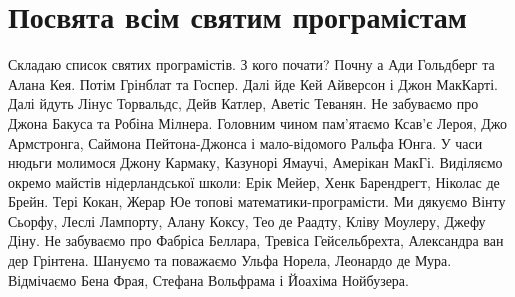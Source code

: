 \section{Посвята всім святим програмістам}

Складаю список святих програмістів. З кого почати? Почну а
Ади Гольдберг та Алана Кея. Потім Грінблат та Госпер.
Далі йде Кей Айверсон і Джон МакКарті.
Далі йдуть Лінус Торвальдс, Дейв Катлер, Аветіс Теванян.
Не забуваємо про Джона Бакуса та Робіна Мілнера.
Головним чином пам'ятаємо Ксав'є Лероя, Джо Армстронга,
Саймона Пейтона-Джонса і мало-відомого Ральфа Юнга.
У часи нюдьги молимося Джону Кармаку, Казунорі Ямаучі, Амерікан МакГі.
Виділяємо окремо майстів нідерландської школи: Ерік Мейер,
Хенк Барендрегт, Ніколас де Брейн.
Тері Кокан, Жерар Юе топові математики-програмісти.
Ми дякуємо Вінту Сьорфу, Леслі Лампорту, Алану Коксу,
Тео де Раадту, Кліву Моулеру, Джефу Діну.
Не забуваємо про Фабріса Беллара, Тревіса Гейсельбрехта,
Александра ван дер Грінтена.
Шануємо та поважаємо Ульфа Норела, Леонардо де Мура.
Відмічаємо Бена Фрая, Стефана Вольфрама і Йоахіма Нойбузера.

\normalsize

